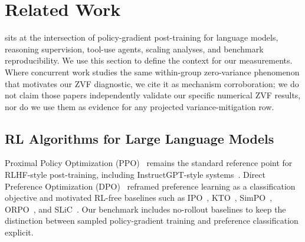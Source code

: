 %

\section{Related Work}
\label{sec:related}

\ours{} sits at the intersection of policy-gradient post-training for
language models, reasoning supervision, tool-use agents, scaling analyses, and
benchmark reproducibility. We use this section to define the context for our
measurements. Where concurrent work studies the same within-group
zero-variance phenomenon that motivates our ZVF diagnostic, we cite it as
mechanism corroboration; we do not claim those papers independently validate
our specific numerical ZVF results, nor do we use them as evidence for any
projected variance-mitigation row.

\subsection{RL Algorithms for Large Language Models}
\label{sec:related:algos}

Proximal Policy Optimization (PPO)~\cite{schulman2017proximal} remains the
standard reference point for RLHF-style post-training, including
InstructGPT-style systems~\cite{ouyang2022training, christiano2017deeprlhf,
stiennon2020summarize, bai2022hhrlhf, bai2022claudecai}. Direct Preference
Optimization (DPO)~\cite{rafailov2024direct} reframed preference learning as a
classification objective and motivated RL-free baselines such as
IPO~\cite{azar2024ipo}, KTO~\cite{ethayarajh2024kto},
SimPO~\cite{meng2024simpo}, ORPO~\cite{hong2024orpo}, and
SLiC~\cite{zhao2023slic}. Our benchmark includes no-rollout baselines to keep
the distinction between sampled policy-gradient training and preference
classification explicit.

